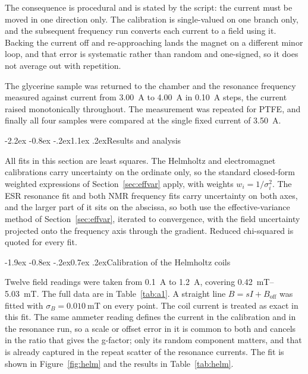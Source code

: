\documentclass[11pt,a4paper]{article}
\makeatletter
\renewcommand\section{\@startsection{section}{1}{\z@}%
  {-2.2ex \@plus -0.8ex \@minus -.2ex}{1.1ex \@plus .2ex}{\normalfont\large\bfseries}}
\renewcommand\subsection{\@startsection{subsection}{2}{\z@}%
  {-1.9ex \@plus -0.8ex \@minus -.2ex}{0.7ex \@plus .2ex}{\normalfont\normalsize\bfseries}}
\makeatother
\begin{document}
The consequence is procedural and is stated by the script: the current must be moved in one
direction only. The calibration is single-valued on one branch only, and the subsequent frequency
run converts each current to a field using it. Backing the current off and re-approaching lands
the magnet on a different minor loop, and that error is systematic rather than random and
one-signed, so it does not average out with repetition.

The glycerine sample was returned to the chamber and the resonance frequency measured against
current from \SI{3.00}{\ampere} to \SI{4.00}{\ampere} in \SI{0.10}{\ampere} steps, the current
raised monotonically throughout. The measurement was repeated for PTFE, and finally all four
samples were compared at the single fixed current of \SI{3.50}{\ampere}.

\section{Results and analysis}

All fits in this section are least squares. The Helmholtz and electromagnet calibrations carry
uncertainty on the ordinate only, so the standard closed-form weighted expressions of
Section~\ref{sec:effvar} apply, with weights $w_i = 1/\sigma_i^{2}$. The ESR resonance fit and
both NMR frequency fits carry uncertainty on both axes, and the larger part of it sits on the
abscissa, so both use the effective-variance method of Section~\ref{sec:effvar}, iterated to
convergence, with the field uncertainty projected onto the frequency axis through the gradient.
Reduced chi-squared is quoted for every fit.

\subsection{Calibration of the Helmholtz coils}
\label{sec:helmfit}

Twelve field readings were taken from \SI{0.1}{\ampere} to \SI{1.2}{\ampere}, covering
\SIrange{0.42}{5.03}{\milli\tesla}. The full data are in Table~\ref{tab:a1}. A straight line
$B = sI + B_{\mathrm{off}}$ was fitted with $\sigma_B = \SI{0.010}{\milli\tesla}$ on every point.
The coil current is treated as exact in this fit. The same ammeter reading defines the current in
the calibration and in the resonance run, so a scale or offset error in it is common to both and
cancels in the ratio that gives the g-factor; only its random component matters, and that is
already captured in the repeat scatter of the resonance currents.
The fit is shown in Figure~\ref{fig:helm} and the results in Table~\ref{tab:helm}.
\end{document}
